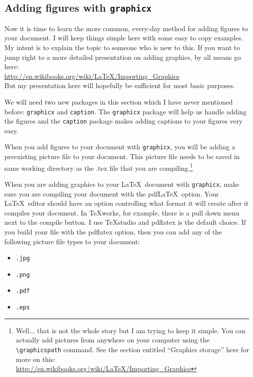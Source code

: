 \documentclass{article}
\newcommand{\nid}{\noindent} %
\begin{document}
\subsection{Adding figures with \texttt{graphicx}}
Now it is time to learn the more common, every-day method for adding figures to your document.  I will keep things simple here with some easy to copy examples.  My intent is to explain the topic to someone who is new to this.  If you want to jump right to a more detailed presentation on adding graphics, by all means go here:\\

\url{http://en.wikibooks.org/wiki/LaTeX/Importing_Graphics}\\

\nid But my presentation here will hopefully be sufficient for most basic purposes.  

We will need two new packages in this section which I have never mentioned before: \texttt{graphicx} and \texttt{caption}.  The \texttt{graphicx} package will help us handle adding the figures and the \texttt{caption} package makes adding captions to your figures very easy.

When you add figures to your document with \texttt{graphicx}, you will be adding a preexisting picture file to your document.  This picture file needs to be saved in same working directory as the .tex file that you are compiling.\footnote{Well... that is not the whole story but I am trying to keep it simple.  You can actually add pictures from anywhere on your computer using the \texttt{\textbackslash graphicspath} command.  See the section entitled ``Graphics storage'' here for more on this:\\\url{http://en.wikibooks.org/wiki/LaTeX/Importing_Graphics}}

When you are adding graphics to your \LaTeX\ document with \texttt{graphicx}, make sure you are compiling your document with the pdf\LaTeX\ option.  Your \LaTeX\ editor should have an option controlling what format it will create after it compiles your document.  In \TeX works, for example, there is a pull down menu next to the compile button.  I use \TeX studio and pdflatex is the default choice.  If you build your file with the pdflatex option, then you can add any of the following picture file types to your document:
\begin{multicols}{2}
\begin{itemize}
\renewcommand{\labelitemi}{$\triangleright$}
\item \texttt{.jpg}
\item \texttt{.png}
\item \texttt{.pdf}
\item \texttt{.eps}
\end{itemize}
\end{multicols}
\end{document}
